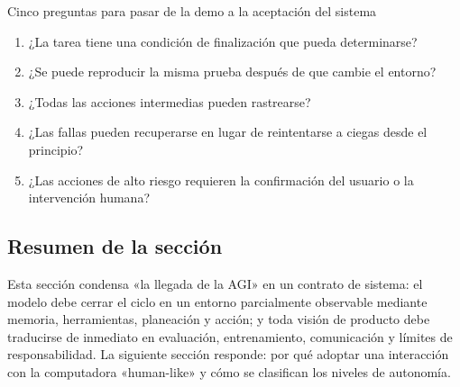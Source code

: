 \begin{importantbox}{Cinco preguntas para pasar de la demo a la aceptación del sistema}
\begin{enumerate}
  \item ¿La tarea tiene una condición de finalización que pueda determinarse?
  \item ¿Se puede reproducir la misma prueba después de que cambie el entorno?
  \item ¿Todas las acciones intermedias pueden rastrearse?
  \item ¿Las fallas pueden recuperarse en lugar de reintentarse a ciegas desde el principio?
  \item ¿Las acciones de alto riesgo requieren la confirmación del usuario o la intervención humana?
\end{enumerate}
\end{importantbox}

\subsection{Resumen de la sección}

Esta sección condensa «la llegada de la AGI» en un contrato de sistema: el modelo debe cerrar el ciclo en un entorno parcialmente observable mediante memoria, herramientas, planeación y acción; y toda visión de producto debe traducirse de inmediato en evaluación, entrenamiento, comunicación y límites de responsabilidad. La siguiente sección responde: por qué adoptar una interacción con la computadora «human-like» y cómo se clasifican los niveles de autonomía.
